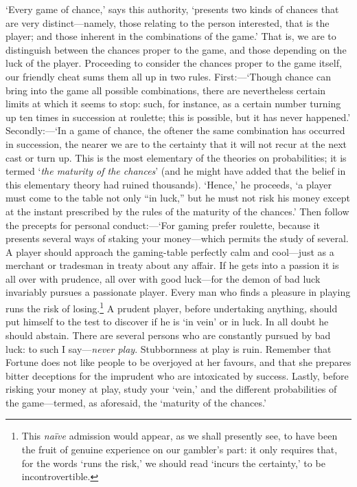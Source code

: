 \documentclass[letterpaper,12pt,oneside,openany]{memoir}
\begin{document}
`Every game of chance,' says this authority, `presents
two kinds of chances that are very distinct---namely,
those relating to the person interested, that is
the player; and those inherent in the combinations of
the game.' That is, we are to distinguish between the
chances proper to the game, and those depending on the
luck of the player. Proceeding to consider the chances
proper to the game itself, our friendly cheat sums them
all up in two rules. First:---`Though chance can bring
into the game all possible combinations, there are nevertheless
certain limits at which it seems to stop: such,
for instance, as a certain number turning up ten times
in succession at roulette; this is possible, but it has
never happened.' Secondly:---`In a game of chance, the
oftener the same combination has occurred in succession,
the nearer we are to the certainty that it will not
recur at the next cast or turn up. This is the most
elementary of the theories on probabilities; it is termed
`\textit{the maturity of the chances}' (and he might have added
that the belief in this elementary theory had ruined
thousands). `Hence,' he proceeds, `a player must
come to the table not only ``in luck,'' but he must not
risk his money except at the instant prescribed by the
rules of the maturity of the chances.' Then follow the
precepts for personal conduct:---`For gaming prefer
roulette, because it presents several ways of staking
your money---which permits the study of several. A
player should approach the gaming-table perfectly calm
and cool---just as a merchant or tradesman in treaty
about any affair. If he gets into a passion it is all
over with prudence, all over with good luck---for the
demon of bad luck invariably pursues a passionate
player. Every man who finds a pleasure in playing
runs the risk of losing.\footnote{This \textit{na\"ive} admission would appear, as we shall presently see,
to have been the fruit of genuine experience on our gambler's part:
it only requires that, for the words `runs the risk,' we should read
`incurs the certainty,' to be incontrovertible.}
A prudent player, before
undertaking anything, should put himself to the test to
discover if he is `in vein' or in luck. In all doubt
he should abstain. There are several persons who are
constantly pursued by bad luck: to such I say---\textit{never
play}. Stubbornness at play is ruin. Remember that
Fortune does not like people to be overjoyed at her
favours, and that she prepares bitter deceptions for the
imprudent who are intoxicated by success. Lastly,
before risking your money at play, study your `vein,'
and the different probabilities of the game---termed, as
aforesaid, the `maturity of the chances.'
\end{document}
